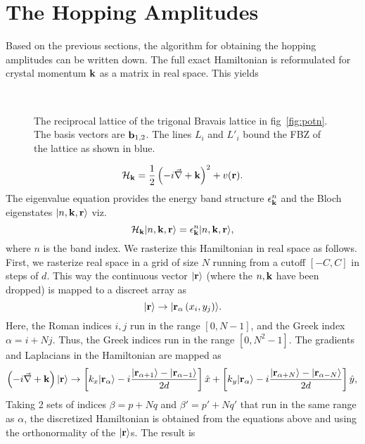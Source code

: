 \documentclass[a4paper,10pt]{article}
\begin{document}
\section{The Hopping Amplitudes}
Based on the previous sections, the algorithm for obtaining the hopping amplitudes can be written down. The full exact Hamiltonian is reformulated for crystal momentum ${\bf k}$ as a matrix in real space. This yields
\pagebreak
\begin{figure}[h!bt]
\ 
\caption{The reciprocal lattice of the trigonal Bravais lattice in fig~\ref{fig:potn}. The basis vectors are ${\bf b}_{1,2}$. The lines $L_i$ and $L'_i$ bound the FBZ of the lattice as shown in blue.}
\label{fig:bzone}
\end{figure}
\begin{equation}
\mathcal{H}_{\bf k} = \frac{1}{2}\left(-i\vec{\nabla} + {\bf k} \right)^2 + v({\bf r}).
\end{equation}
The eigenvalue equation provides the energy band structure $\epsilon^{n}_{\bf k}$ and the Bloch eigenstates $|{n}, {\bf k},{\bf r}\rangle$ viz.
\begin{equation}
\mathcal{H}_{\bf k} |{n}, {\bf k},{\bf r}\rangle = \epsilon^{n}_{\bf k} |n,{\bf k}, {\bf r}\rangle,
\end{equation}
where $n$ is the band index. We rasterize this Hamiltonian in real space as follows. First, we rasterize real space in a grid of size $N$ running from a cutoff $[-C,C]$ in steps of $d$. This way the continuous vector $|{\bf r}\rangle$
(where the $n,{\bf k}$ have been dropped) is mapped to a discreet array as 
\begin{equation}
|{\bf r}\rangle \rightarrow |{\bf r}_{\alpha}\left(x_i,y_j\right)\rangle.
\end{equation}
Here, the Roman indices $i,j$ run in the range $[0,N-1]$, and the Greek index $\alpha = i + N j$. Thus, the Greek indices run in the range $[0,N^2-1]$. The gradients and Laplacians in the Hamiltonian are mapped as
\begin{equation}
\left(-i\vec{\nabla}+{\bf k} \right) |{\bf r}\rangle \rightarrow \left[k_x |{\bf r}_{\alpha}\rangle-i\frac{|{\bf r}_{\alpha+1}\rangle-|{\bf r}_{\alpha-1}\rangle}{2d} \right] \hat{x} + \left[k_y |{\bf r}_{\alpha}\rangle -i\frac{|{\bf r}_{\alpha+N}\rangle-|{\bf r}_{\alpha-N}\rangle}{2d} \right]\hat{y}, \nonumber \\
\end{equation}
Taking 2 sets of indices $\beta = p+Nq$ and $\beta' = p'+Nq'$ that run in the same range as $\alpha$, the discretized Hamiltonian is obtained from the equations above and using the orthonormality of the $|{\bf r}\rangle$s. The result is
\end{document}
